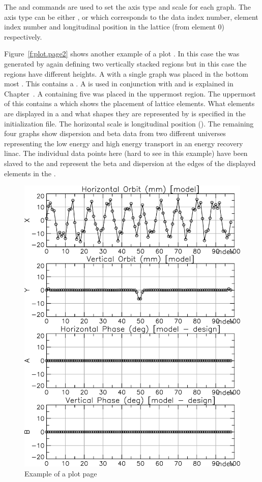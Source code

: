 The  and  commands are used to set the axis type and scale for each
graph. The axis type can be either ,  or  which corresponds
to the data index number, element index number and longitudinal position in the lattice
(from element 0) respectively.

Figure~\ref{f:plot.page2} shows another example of a plot .  In this case the
 was generated by again defining two vertically stacked regions but in this case
the regions have different heights.  A  with a single graph was placed
in the bottom most .  This  contains a .  A
 is used in conjunction with  and is explained in
Chapter~. A  containing five  was placed in
the uppermost region. The uppermost  of this  contains a
 which shows the placement of lattice elements.  What elements are
displayed in a  and what shapes they are represented by is specified in the
initialization file. The horizontal scale is longitudinal position ().  The
remaining four graphs show dispersion and beta data from two different universes
representing the low energy and high energy transport in an energy recovery linac. The
individual data points here (hard to see in this example) have been slaved to the
 and represent the beta and dispersion at the edges of the displayed
elements in the .

\begin{figure}
  \centering
  \includegraphics[width=5in]{plot-page1.pdf}
  \caption{Example of a plot page}
  \label{f:plot.page1}
\end{figure}

